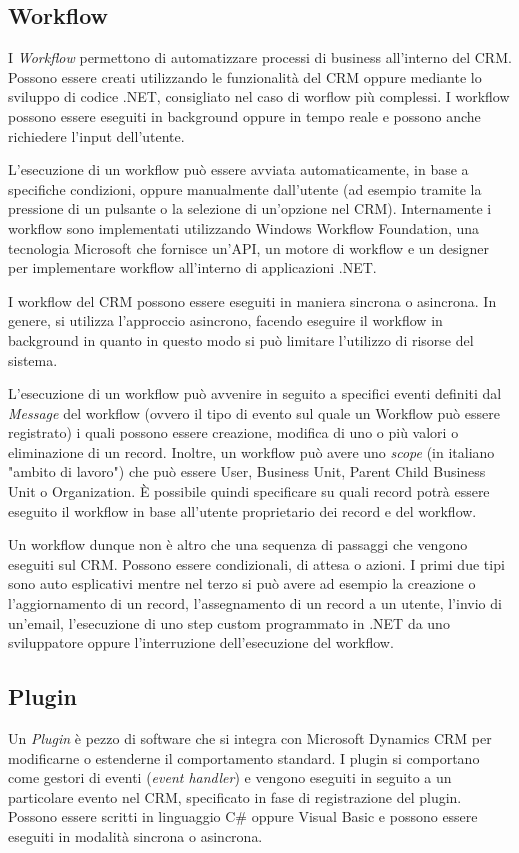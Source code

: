 \subsection{Workflow}
I \textit{Workflow} permettono di automatizzare processi di business all'interno del CRM. Possono essere creati utilizzando le funzionalità del CRM oppure mediante lo sviluppo di codice .NET, consigliato nel caso di worflow più complessi. I workflow possono essere eseguiti in background oppure in tempo reale e possono anche richiedere l'input dell'utente.

L'esecuzione di un workflow può essere avviata automaticamente, in base a specifiche condizioni, oppure manualmente dall'utente (ad esempio tramite la pressione di un pulsante o la selezione di un'opzione nel CRM). Internamente i workflow sono implementati utilizzando Windows Workflow Foundation, una tecnologia Microsoft che fornisce un'API, un motore di workflow e un designer per implementare workflow all'interno di applicazioni .NET.

I workflow del CRM possono essere eseguiti in maniera sincrona o asincrona. In genere, si utilizza l'approccio asincrono, facendo eseguire il workflow in background in quanto in questo modo si può limitare l'utilizzo di risorse del sistema.

L'esecuzione di un workflow può avvenire in seguito a specifici eventi definiti dal \textit{Message} del workflow (ovvero il tipo di evento sul quale un Workflow può essere registrato) i quali possono essere creazione, modifica di uno o più valori o eliminazione di un record. Inoltre, un workflow può avere uno \textit{scope} (in italiano "ambito di lavoro") che può essere User, Business Unit, Parent Child Business Unit o Organization. È possibile quindi specificare su quali record potrà essere eseguito il workflow in base all'utente proprietario dei record e del workflow.

Un workflow dunque non è altro che una sequenza di passaggi che vengono eseguiti sul CRM. Possono essere condizionali, di attesa o azioni. I primi due tipi sono auto esplicativi mentre nel terzo si può avere ad esempio la creazione o l'aggiornamento di un record, l'assegnamento di un record a un utente, l'invio di un'email, l'esecuzione di uno step custom programmato in .NET da uno sviluppatore oppure l'interruzione dell'esecuzione del workflow.

\subsection{Plugin}
Un \textit{Plugin} è pezzo di software che si integra con Microsoft Dynamics CRM per modificarne o estenderne il comportamento standard. I plugin si comportano come gestori di eventi (\textit{event handler}) e vengono eseguiti in seguito a un particolare evento nel CRM, specificato in fase di registrazione del plugin. Possono essere scritti in linguaggio C\# oppure Visual Basic e possono essere eseguiti in modalità sincrona o asincrona.

